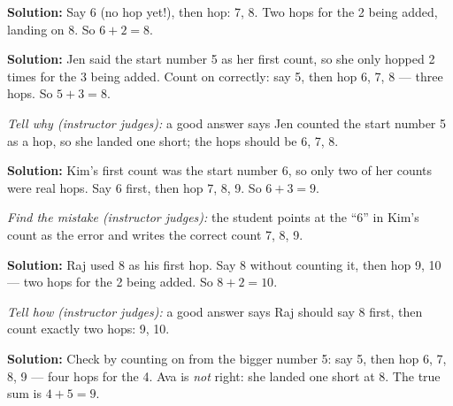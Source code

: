 \documentclass[12pt]{article}
\begin{document}




\textbf{Solution:} Say 6 (no hop yet!), then hop: 7, 8. Two hops for the 2
being added, landing on 8. So $6+2=8$. 


\textbf{Solution:} Jen said the start number 5 as her first count, so she
only hopped 2 times for the 3 being added. Count on correctly: say 5, then
hop 6, 7, 8 --- three hops. So $5+3=8$. 

\emph{Tell why (instructor judges):} a good answer says Jen counted the
start number 5 as a hop, so she landed one short; the hops should be
6, 7, 8.


\textbf{Solution:} Kim's first count was the start number 6, so only two of
her counts were real hops. Say 6 first, then hop 7, 8, 9. So $6+3=9$.

\emph{Find the mistake (instructor judges):} the student points at the
``6'' in Kim's count as the error and writes the correct count 7, 8, 9.


\textbf{Solution:} Raj used 8 as his first hop. Say 8 without counting it,
then hop 9, 10 --- two hops for the 2 being added. So $8+2=10$. 

\emph{Tell how (instructor judges):} a good answer says Raj should say 8
first, then count exactly two hops: 9, 10.


\textbf{Solution:} Check by counting on from the bigger number 5: say 5,
then hop 6, 7, 8, 9 --- four hops for the 4. Ava is \emph{not} right: she
landed one short at 8. The true sum is $4+5=9$. 
\end{document}
